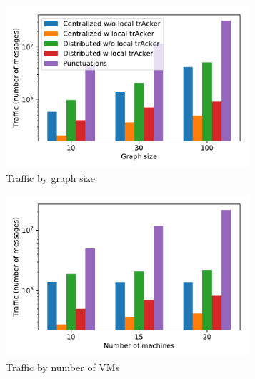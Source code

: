 \begin{figure}[t!]
    \begin{subfigure}[t]{0.3\textwidth}
            \includegraphics[width=0.99\textwidth]{Chapters/Tracker/pics/traffic_by_graph_size_bars.pdf}
            \caption{Traffic by graph size}
            \label{traffic_graph}
    \end{subfigure}
    \hspace{5mm}
    \begin{subfigure}[t]{0.3\textwidth}
            \includegraphics[width=0.99\textwidth]{Chapters/Tracker/pics/traffic_by_number_of_machines_bars.pdf}
            \caption{Traffic by number of VMs}
            \label{traffic_machines}
    \end{subfigure}
    \hspace{5mm}
    \begin{subfigure}[t]{0.3\textwidth}

\end{subfigure}
\end{figure}
